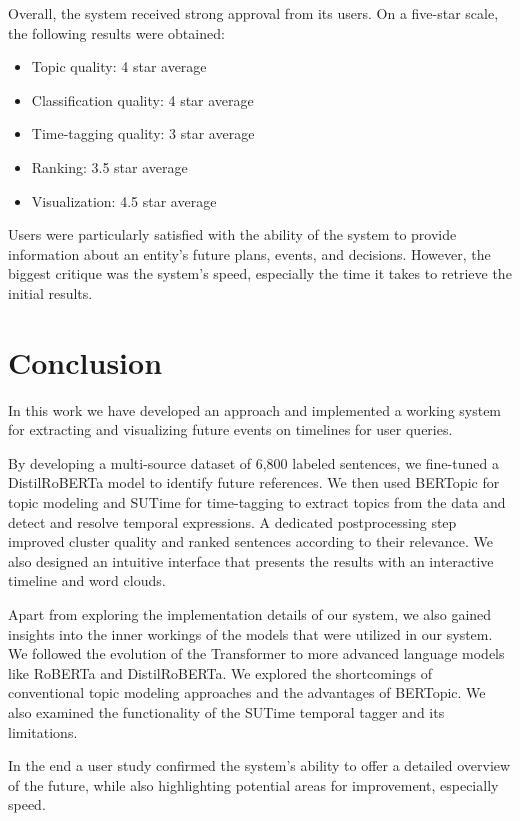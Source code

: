 \documentclass[a4paper,10pt]{report}
\begin{document}
Overall, the system received strong approval from its users. On a five-star scale, the following results were obtained:
\begin{itemize}
  \item Topic quality: 4 star average 
  \item Classification quality: 4 star average
  \item Time-tagging quality: 3 star average 
  \item Ranking: 3.5 star average
  \item Visualization: 4.5 star average 
\end{itemize}
Users were particularly satisfied with the ability of the system to provide information about an entity's future plans, events, and decisions. However, the biggest critique was the system's speed, especially the time it takes to retrieve the initial results. 

\chapter{Conclusion}
In this work we have developed an approach and implemented a working system for extracting and visualizing future events on timelines for user queries. 

By developing a multi-source dataset of 6,800 labeled sentences, we fine-tuned a DistilRoBERTa model to identify future references. We then used BERTopic for topic modeling and SUTime for time-tagging to extract topics from the data and detect and resolve temporal expressions. A dedicated postprocessing step improved cluster quality and ranked sentences according to their relevance. We also designed an intuitive interface that presents the results with an interactive timeline and word clouds. 

Apart from exploring the implementation details of our system, we also gained insights into the inner workings of the models that were utilized in our system. We followed the evolution of the Transformer to more advanced language models like RoBERTa and DistilRoBERTa. We explored the shortcomings of conventional topic modeling approaches and the advantages of BERTopic. We also examined the functionality of the SUTime temporal tagger and its limitations.

In the end a user study confirmed the system's ability to offer a detailed overview of the future, while also highlighting potential areas for improvement, especially speed.



\end{document}
